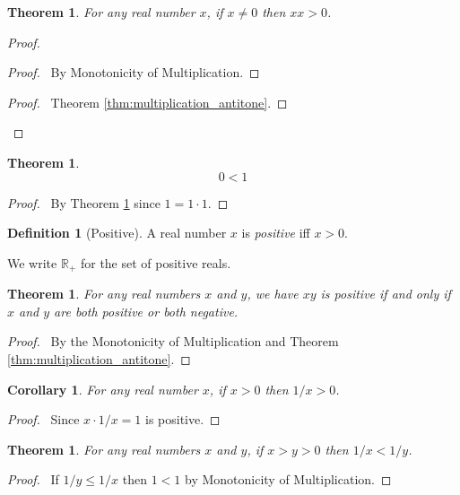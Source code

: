 \documentclass{book}
\let\qed\relax
\newtheorem{cor}{Corollary}[ax]
\newtheorem{thm}[ax]{Theorem}
\theoremstyle{definition}
\newtheorem{df}[ax]{Definition}
\begin{document}
\begin{thm}
\label{thm:square_positive}
For any real number $x$, if $x \neq 0$ then $xx > 0$.
\end{thm}

\begin{proof}
\pf
{}
\begin{proof}
	\pf\ By Monotonicity of Multiplication.
\end{proof}
\begin{proof}
	\pf\ Theorem \ref{thm:multiplication_antitone}.
\end{proof}
\qed
\end{proof}

\begin{thm}
\[ 0 < 1 \]
\end{thm}

\begin{proof}
\pf\ By Theorem \ref{thm:square_positive} since $1 = 1 \cdot 1$. \qed
\end{proof}

\begin{df}[Positive]
A real number $x$ is \emph{positive} iff $x > 0$.

We write $\mathbb{R}_+$ for the set of positive reals.
\end{df}

\begin{thm}
For any real numbers $x$ and $y$, we have $xy$ is positive if and only if $x$ and $y$ are both positive or both negative.
\end{thm}

\begin{proof}
\pf\ By the Monotonicity of Multiplication and Theorem \ref{thm:multiplication_antitone}. \qed
\end{proof}

\begin{cor}
For any real number $x$, if $x > 0$ then $1/x > 0$.
\end{cor}

\begin{proof}
\pf\ Since $x \cdot 1/x = 1$ is positive. \qed
\end{proof}

\begin{thm}
For any real numbers $x$ and $y$, if $x > y > 0$ then $1/x < 1/y$.
\end{thm}

\begin{proof}
\pf\ If $1/y \leq 1/x$ then $1 < 1$ by Monotonicity of Multiplication. \qed
\end{proof}
\end{document}
